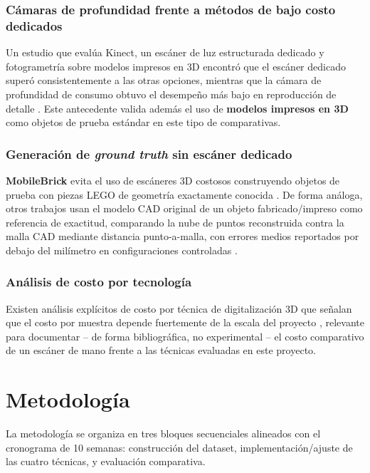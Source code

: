 \documentclass[11pt]{article}
\begin{document}
\subsubsection*{C\'amaras de profundidad frente a m\'etodos de bajo costo dedicados}
Un estudio que eval\'ua Kinect, un esc\'aner de luz estructurada dedicado y fotogrametr\'ia sobre modelos impresos en 3D encontr\'o que el esc\'aner dedicado super\'o consistentemente a las otras opciones, mientras que la c\'amara de profundidad de consumo obtuvo el desempe\~no m\'as bajo en reproducci\'on de detalle \cite{low_cost_scanning}. Este antecedente valida adem\'as el uso de \textbf{modelos impresos en 3D} como objetos de prueba est\'andar en este tipo de comparativas.

\subsubsection*{Generaci\'on de \emph{ground truth} sin esc\'aner dedicado}
\textbf{MobileBrick} evita el uso de esc\'aneres 3D costosos construyendo objetos de prueba con piezas LEGO de geometr\'ia exactamente conocida \cite{mobilebrick}. De forma an\'aloga, otros trabajos usan el modelo CAD original de un objeto fabricado/impreso como referencia de exactitud, comparando la nube de puntos reconstruida contra la malla CAD mediante distancia punto-a-malla, con errores medios reportados por debajo del mil\'imetro en configuraciones controladas \cite{sdf2sdf,scanner_sim}.

\subsubsection*{An\'alisis de costo por tecnolog\'ia}
Existen an\'alisis expl\'icitos de costo por t\'ecnica de digitalizaci\'on 3D que se\~nalan que el costo por muestra depende fuertemente de la escala del proyecto \cite{costo_digitalizacion,review_scanners}, relevante para documentar -- de forma bibliogr\'afica, no experimental -- el costo comparativo de un esc\'aner de mano frente a las t\'ecnicas evaluadas en este proyecto.

\section{Metodolog\'ia}

La metodolog\'ia se organiza en tres bloques secuenciales alineados con el cronograma de 10 semanas: construcci\'on del dataset, implementaci\'on/ajuste de las cuatro t\'ecnicas, y evaluaci\'on comparativa.
\end{document}
